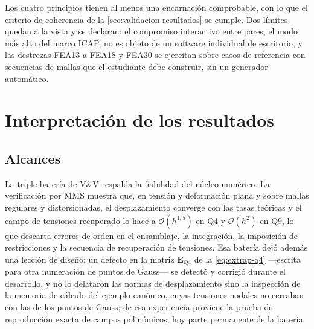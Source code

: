 Los cuatro principios tienen al menos una encarnación comprobable, con lo que el criterio de coherencia de la \autoref{sec:validacion-resultados} se cumple. Dos límites quedan a la vista y se declaran: el compromiso interactivo entre pares, el modo más alto del marco ICAP, no es objeto de un software individual de escritorio, y las destrezas FEA13 a FEA18 y FEA30 se ejercitan sobre casos de referencia con secuencias de mallas que el estudiante debe construir, sin un generador automático.

\section{Interpretación de los resultados}
\label{sec:interpretacion}

\subsection{Alcances}

La triple batería de V\&V respalda la fiabilidad del núcleo numérico. La verificación por MMS muestra que, en tensión y deformación plana y sobre mallas regulares y distorsionadas, el desplazamiento converge con las tasas teóricas y el campo de tensiones recuperado lo hace a $\mathcal{O}(h^{1{,}5})$ en Q4 y $\mathcal{O}(h^{2})$ en Q9, lo que descarta errores de orden en el ensamblaje, la integración, la imposición de restricciones y la secuencia de recuperación de tensiones. Esa batería dejó además una lección de diseño: un defecto en la matriz $\bm{E}_{\text{Q4}}$ de la \autoref{eq:extrap-q4} —escrita para otra numeración de puntos de Gauss— se detectó y corrigió durante el desarrollo, y no lo delataron las normas de desplazamiento sino la inspección de la memoria de cálculo del ejemplo canónico, cuyas tensiones nodales no cerraban con las de los puntos de Gauss; de esa experiencia proviene la prueba de reproducción exacta de campos polinómicos, hoy parte permanente de la batería.

